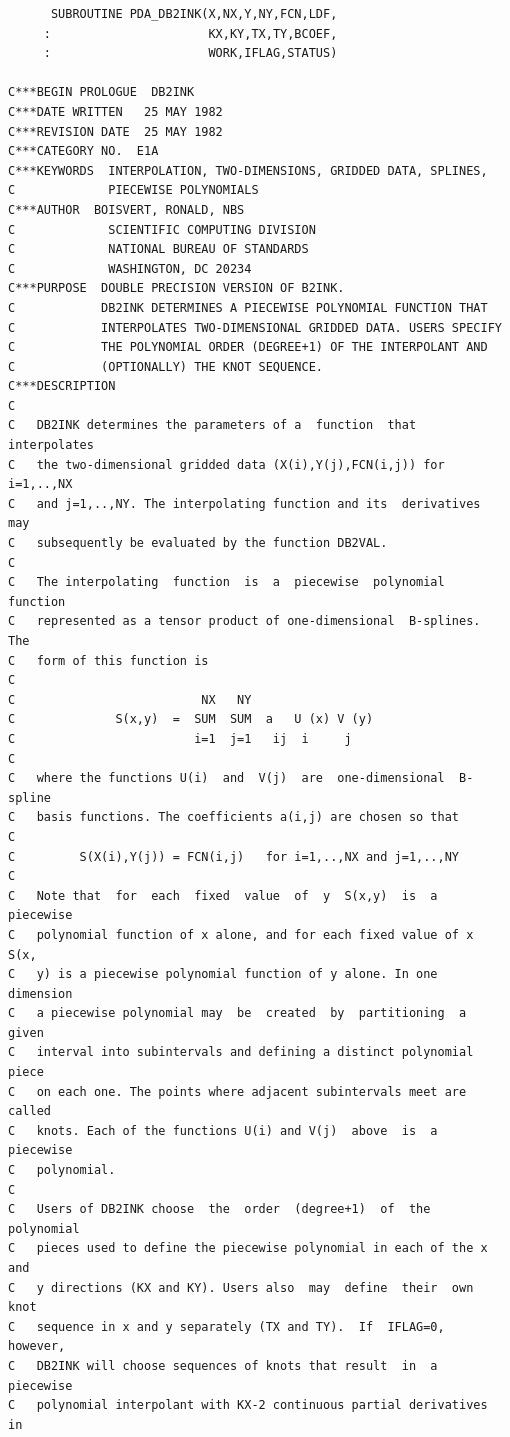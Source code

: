 \documentclass[11pt,twoside]{article}
\begin{document}
\begin{verbatim}
      SUBROUTINE PDA_DB2INK(X,NX,Y,NY,FCN,LDF,
     :                      KX,KY,TX,TY,BCOEF,
     :                      WORK,IFLAG,STATUS)
 
C***BEGIN PROLOGUE  DB2INK
C***DATE WRITTEN   25 MAY 1982
C***REVISION DATE  25 MAY 1982
C***CATEGORY NO.  E1A
C***KEYWORDS  INTERPOLATION, TWO-DIMENSIONS, GRIDDED DATA, SPLINES,
C             PIECEWISE POLYNOMIALS
C***AUTHOR  BOISVERT, RONALD, NBS
C             SCIENTIFIC COMPUTING DIVISION
C             NATIONAL BUREAU OF STANDARDS
C             WASHINGTON, DC 20234
C***PURPOSE  DOUBLE PRECISION VERSION OF B2INK.
C            DB2INK DETERMINES A PIECEWISE POLYNOMIAL FUNCTION THAT
C            INTERPOLATES TWO-DIMENSIONAL GRIDDED DATA. USERS SPECIFY
C            THE POLYNOMIAL ORDER (DEGREE+1) OF THE INTERPOLANT AND
C            (OPTIONALLY) THE KNOT SEQUENCE.
C***DESCRIPTION
C
C   DB2INK determines the parameters of a  function  that  interpolates
C   the two-dimensional gridded data (X(i),Y(j),FCN(i,j)) for i=1,..,NX
C   and j=1,..,NY. The interpolating function and its  derivatives  may
C   subsequently be evaluated by the function DB2VAL.
C
C   The interpolating  function  is  a  piecewise  polynomial  function
C   represented as a tensor product of one-dimensional  B-splines.  The
C   form of this function is
C
C                          NX   NY
C              S(x,y)  =  SUM  SUM  a   U (x) V (y)
C                         i=1  j=1   ij  i     j
C
C   where the functions U(i)  and  V(j)  are  one-dimensional  B-spline
C   basis functions. The coefficients a(i,j) are chosen so that
C
C         S(X(i),Y(j)) = FCN(i,j)   for i=1,..,NX and j=1,..,NY
C
C   Note that  for  each  fixed  value  of  y  S(x,y)  is  a  piecewise
C   polynomial function of x alone, and for each fixed value of x  S(x,
C   y) is a piecewise polynomial function of y alone. In one  dimension
C   a piecewise polynomial may  be  created  by  partitioning  a  given
C   interval into subintervals and defining a distinct polynomial piece
C   on each one. The points where adjacent subintervals meet are called
C   knots. Each of the functions U(i) and V(j)  above  is  a  piecewise
C   polynomial.
C
C   Users of DB2INK choose  the  order  (degree+1)  of  the  polynomial
C   pieces used to define the piecewise polynomial in each of the x and
C   y directions (KX and KY). Users also  may  define  their  own  knot
C   sequence in x and y separately (TX and TY).  If  IFLAG=0,  however,
C   DB2INK will choose sequences of knots that result  in  a  piecewise
C   polynomial interpolant with KX-2 continuous partial derivatives  in

\end{verbatim}
\end{document}
